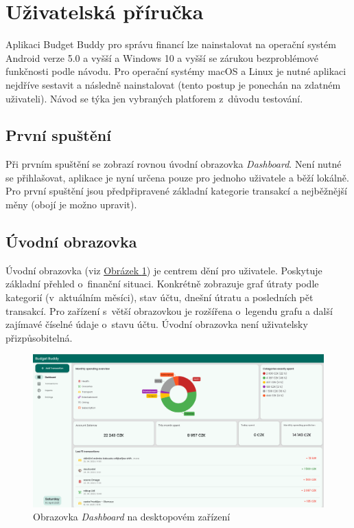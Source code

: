 \documentclass[
  biblatex,
  figures=true,
  tables=false,
  glossaries,
  index
]{kidiplom}
\begin{document}
\section{Uživatelská příručka}
Aplikaci Budget Buddy pro správu financí lze nainstalovat na operační systém Android verze 5.0 a vyšší a Windows 10 a vyšší se zárukou bezproblémové funkčnosti podle návodu. Pro operační systémy macOS a Linux je nutné aplikaci nejdříve sestavit a následně nainstalovat (tento postup je ponechán na zdatném uživateli). Návod se týka jen vybraných platforem z~důvodu testování. 

\subsection{První spuštění}
Při prvním spuštění se zobrazí rovnou úvodní obrazovka \textit{Dashboard}. Není nutné se přihlašovat, aplikace je nyní určena pouze pro jednoho uživatele a běží lokálně. Pro první spuštění jsou předpřipravené základní kategorie transakcí a nejběžnější měny (obojí je možno upravit). 

\subsection{Úvodní obrazovka}
Úvodní obrazovka (viz \hyperref[fig:dashboard-large]{Obrázek \ref{fig:dashboard-large}}) je centrem dění pro uživatele. Poskytuje základní přehled o~finanční situaci. Konkrétně zobrazuje graf útraty podle kategorií (v~aktuálním měsíci), stav účtu, dnešní útratu a posledních pět transakcí. Pro zařízení s~větší obrazovkou je rozšířena o~legendu grafu a další zajímavé číselné údaje o~stavu účtu. Úvodní obrazovka není uživatelsky přizpůsobitelná.

\begin{figure}
  \centering
  \includegraphics[width=\textwidth]{images/dashboard-large.png}
  \caption{Obrazovka \textit{Dashboard} na desktopovém zařízení}
  \label{fig:dashboard-large}
\end{figure}
\end{document}
